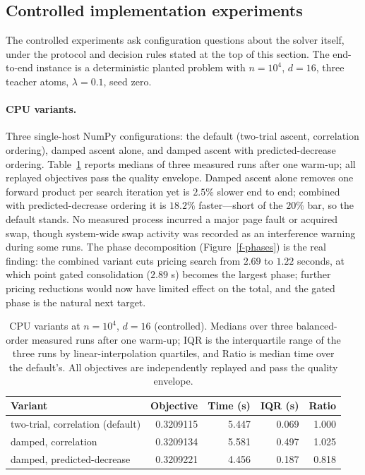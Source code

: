 \documentclass[12pt]{article}
\theoremstyle{plain}
\theoremstyle{definition}
\begin{document}
\subsection{Controlled implementation experiments}\label{s-exp-controlled}

The controlled experiments ask configuration questions about the solver
itself, under the protocol and decision rules stated at the top of this
section. The end-to-end instance is a deterministic planted problem with
$n=10^4$, $d=16$, three teacher atoms, $\lambda=0.1$, seed zero.

\paragraph{CPU variants.}
Three single-host NumPy configurations: the default (two-trial ascent,
correlation ordering), damped ascent alone, and damped ascent with
predicted-decrease ordering. Table~\ref{tab-cpu} reports medians of three
measured runs after one warm-up; all replayed objectives pass the quality
envelope. Damped ascent alone removes one forward product per search
iteration yet is $2.5\%$ slower end to end; combined with predicted-decrease
ordering it is $18.2\%$ faster---short of the $20\%$ bar, so the default
stands. No measured process incurred a major page fault or acquired swap,
though system-wide swap activity was recorded as an interference warning
during some runs. The phase decomposition (Figure~\ref{f-phases}) is the real
finding: the combined variant cuts pricing search from $2.69$ to $1.22$
seconds, at which point gated consolidation ($2.89$ s) becomes the largest
phase; further pricing reductions would now have limited effect on the total,
and the gated phase is the natural next target.

\begin{table}[tb]
\centering
\small
\begin{tabular}{lrrrr}
\toprule
Variant & Objective & Time (s) & IQR (s) & Ratio \\
\midrule
two-trial, correlation (default) & 0.3209115 & 5.447 & 0.069 & 1.000 \\
damped, correlation & 0.3209134 & 5.581 & 0.497 & 1.025 \\
damped, predicted-decrease & 0.3209221 & 4.456 & 0.187 & 0.818 \\
\bottomrule
\end{tabular}
\caption{CPU variants at $n=10^4$, $d=16$ (controlled). Medians over three
balanced-order measured runs after one warm-up; IQR is the interquartile
range of the three runs by linear-interpolation quartiles, and Ratio is
median time over the default's. All objectives are independently replayed
and pass the quality envelope.}
\label{tab-cpu}
\end{table}
\end{document}
